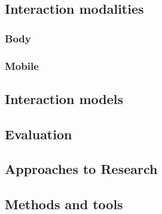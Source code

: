 \subsection{Interaction modalities}
\subsubsection{Body}
\subsubsection{Mobile}

\subsection{Interaction models}

\subsection{Evaluation}

\subsection{Approaches to Research}
\subsection{Methods and tools}







 





